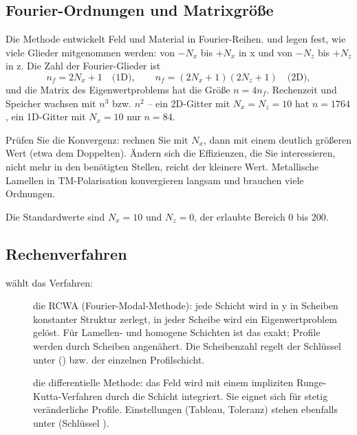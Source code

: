 \subsection{Fourier-Ordnungen und Matrixgröße}\label{sec:fg-ordnungen}

Die Methode entwickelt Feld und Material in Fourier-Reihen.  und 
legen fest, wie viele Glieder mitgenommen werden: von $-N_x$ bis $+N_x$ in x und von $-N_z$ bis
$+N_z$ in z. Die Zahl der Fourier-Glieder ist
\[
  n_f = 2N_x + 1 \quad\text{(1D)}, \qquad n_f = (2N_x + 1)(2N_z + 1) \quad\text{(2D)},
\]
und die Matrix des Eigenwertproblems hat die Größe $n = 4 n_f$. Rechenzeit und Speicher wachsen
mit $n^3$ bzw. $n^2$ -- ein 2D-Gitter mit $N_x = N_z = 10$ hat $n = 1764$, ein 1D-Gitter mit
$N_x = 10$ nur $n = 84$.

\begin{tipp}
Prüfen Sie die Konvergenz: rechnen Sie mit $N_x$, dann mit einem deutlich größeren Wert (etwa dem
Doppelten). Ändern sich die Effizienzen, die Sie interessieren, nicht mehr in den benötigten
Stellen, reicht der kleinere Wert. Metallische Lamellen in TM-Polarisation konvergieren langsam und
brauchen viele Ordnungen.
\end{tipp}

Die Standardwerte sind $N_x = 10$ und $N_z = 0$, der erlaubte Bereich 0 bis 200.

\subsection{Rechenverfahren}\label{sec:fg-solver}

 wählt das Verfahren:
\begin{description}
  \item[] die RCWA (Fourier-Modal-Methode): jede Schicht wird in y in Scheiben
    konstanter Struktur zerlegt, in jeder Scheibe wird ein Eigenwertproblem gelöst. Für
    Lamellen- und homogene Schichten ist das exakt; Profile werden durch Scheiben angenähert.
    Die Scheibenzahl regelt der Schlüssel  unter 
    () bzw.  der einzelnen Profilschicht.
  \item[] die differentielle Methode: das Feld wird mit einem impliziten
    Runge-Kutta-Verfahren durch die Schicht integriert. Sie eignet sich für stetig veränderliche
    Profile. Einstellungen (Tableau, Toleranz) stehen ebenfalls unter 
    (Schlüssel ).
\end{description}


